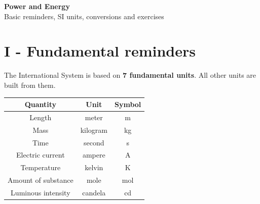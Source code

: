 \documentclass[11pt,a4paper]{article}
\newcommand{\theorybox}[2]{
\begin{tcolorbox}[title=\textbf{#1}]
#2
\end{tcolorbox}
}
\begin{document}

\begin{center}
{\LARGE \textbf{Power and Energy}}\\[0.3cm]
{\large Basic reminders, SI units, conversions and exercises}\\[0.5cm]
\end{center}


\section*{I - Fundamental reminders}

\theorybox{A - The 7 base units of the International System (SI)}{
The International System is based on \textbf{7 fundamental units}.  
All other units are built from them.

\begin{center}
\begin{tabular}{|c|c|c|}
\hline
\textbf{Quantity} & \textbf{Unit} & \textbf{Symbol} \\
\hline
Length & meter & m \\
Mass & kilogram & kg \\
Time & second & s \\
Electric current & ampere & A \\
Temperature & kelvin & K \\
Amount of substance & mole & mol \\
Luminous intensity & candela & cd \\
\hline
\end{tabular}
\end{center}
}
\end{document}
